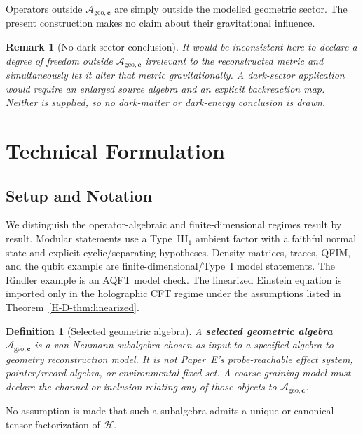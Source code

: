 \documentclass[12pt,a4paper,openany]{book}
\newtheorem{definition}[theorem]{Definition}
\newtheorem{remark}[theorem]{Remark}
\begin{document}
Operators outside $\mathcal{A}_{\mathrm{geo},\mathbf{c}}$ are simply outside the modelled geometric sector.  The present construction makes no claim about their gravitational influence.

\begin{remark}[No dark-sector conclusion]
It would be inconsistent here to declare a degree of freedom outside $\mathcal{A}_{\mathrm{geo},\mathbf{c}}$ irrelevant to the reconstructed metric and simultaneously let it alter that metric gravitationally.  A dark-sector application would require an enlarged source algebra and an explicit backreaction map.  Neither is supplied, so no dark-matter or dark-energy conclusion is drawn.
\end{remark}

\section{Technical Formulation}
\label{H-D-sec:technical}

\subsection{Setup and Notation}

We distinguish the operator-algebraic and finite-dimensional regimes result by result.  Modular statements use a Type~III$_1$ ambient factor with a faithful normal state and explicit cyclic/separating hypotheses.  Density matrices, traces, QFIM, and the qubit example are finite-dimensional/Type~I model statements.  The Rindler example is an AQFT model check.  The linearized Einstein equation is imported only in the holographic CFT regime under the assumptions listed in Theorem~\ref{H-D-thm:linearized}.

\begin{definition}[Selected geometric algebra]
\label{H-D-def:accessible}
A \textbf{selected geometric algebra} $\mathcal{A}_{\mathrm{geo},\mathbf{c}}$ is a von Neumann subalgebra chosen as input to a specified algebra-to-geometry reconstruction model.  It is not Paper~E's probe-reachable effect system, pointer/record algebra, or environmental fixed set.  A coarse-graining model must declare the channel or inclusion relating any of those objects to $\mathcal{A}_{\mathrm{geo},\mathbf{c}}$.
\end{definition}

No assumption is made that such a subalgebra admits a unique or canonical tensor factorization of $\mathcal{H}$.
\end{document}
